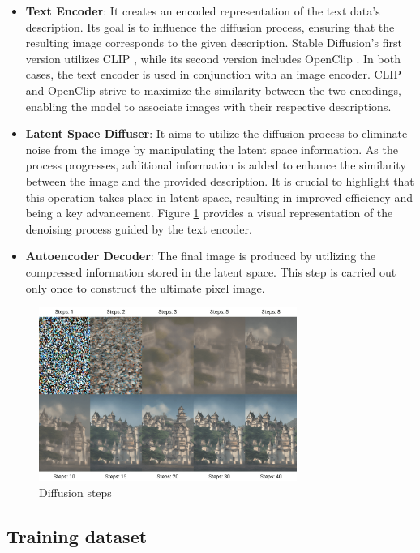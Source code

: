 \begin{itemize}
    \item \textbf{Text Encoder}: It creates an encoded representation of the text data's description. Its goal is to influence the diffusion process, ensuring that the resulting image corresponds to the given description. Stable Diffusion's first version utilizes CLIP \cite{radford2021learning}, while its second version includes OpenClip \cite{cherti2022reproducible}. In both cases, the text encoder is used in conjunction with an image encoder. CLIP and OpenClip strive to maximize the similarity between the two encodings, enabling the model to associate images with their respective descriptions.
    \item \textbf{Latent Space Diffuser}: It aims to utilize the diffusion process to eliminate noise from the image by manipulating the latent space information. As the process progresses, additional information is added to enhance the similarity between the image and the provided description. It is crucial to highlight that this operation takes place in latent space, resulting in improved efficiency and being a key advancement. Figure \ref{fig:DProcess} provides a visual representation of the denoising process guided by the text encoder.
    \item \textbf{Autoencoder Decoder}: The final image is produced by utilizing the compressed information stored in the latent space. This step is carried out only once to construct the ultimate pixel image.
\end{itemize}

\begin{figure}
    \centering
    \includegraphics[width=0.75\textwidth]{Pictures/DProcess.png} 
    \caption{Diffusion steps \cite{wikiStableDiffusion}}
    \label{fig:DProcess}
\end{figure}

\subsection{Training dataset}

